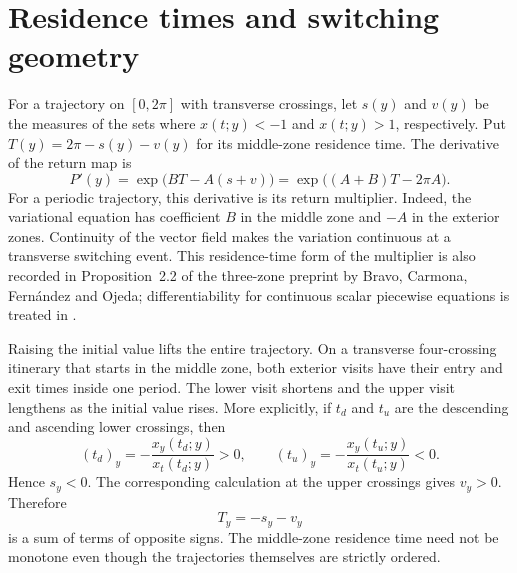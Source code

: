 \documentclass[11pt,a4paper]{article}
\begin{document}
\section{Residence times and switching geometry}
For a trajectory on $[0,2\pi]$ with transverse crossings, let $s(y)$
and $v(y)$ be the measures of the sets where $x(t;y)<-1$ and $x(t;y)>1$,
respectively. Put $T(y)=2\pi-s(y)-v(y)$ for its middle-zone residence time.
The derivative of the return map is
\begin{equation}\label{eq:multiplier}
 P'(y)=\exp\bigl(BT-A(s+v)\bigr)
      =\exp\bigl((A+B)T-2\pi A\bigr).
\end{equation}
For a periodic trajectory, this derivative is its return multiplier.
Indeed, the variational equation has coefficient $B$ in the middle zone
and $-A$ in the exterior zones. Continuity of the vector field makes the
variation continuous at a transverse switching event.
This residence-time form of the multiplier is also recorded in
Proposition~2.2 of the three-zone preprint by Bravo, Carmona, Fern\'andez
and Ojeda; differentiability for continuous scalar
piecewise equations is treated in \cite{Bravo2007}.

Raising the initial value lifts the entire trajectory. On a transverse
four-crossing itinerary that starts in the middle zone, both exterior
visits have their entry and exit times inside one period.
The lower visit shortens and the upper visit lengthens as the initial
value rises. More explicitly, if $t_d$ and $t_u$ are the
descending and ascending lower crossings, then
\[
 (t_d)_y=-\frac{x_y(t_d;y)}{x_t(t_d;y)}>0,
 \qquad
 (t_u)_y=-\frac{x_y(t_u;y)}{x_t(t_u;y)}<0.
\]
Hence $s_y<0$. The corresponding calculation at the upper crossings gives
$v_y>0$. Therefore
\begin{equation}\label{eq:competition}
 T_y=-s_y-v_y
\end{equation}
is a sum of terms of opposite signs. The middle-zone residence time need
not be monotone even though the trajectories themselves are strictly ordered.
\end{document}
